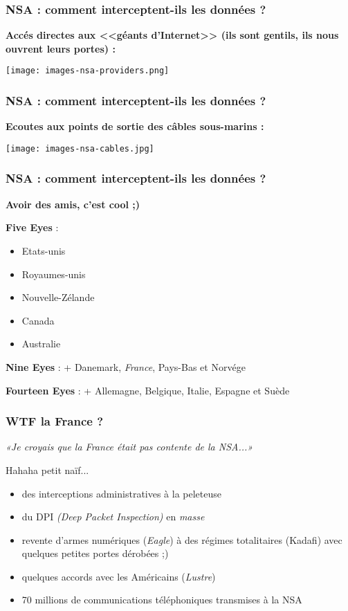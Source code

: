 \begin{frame}\frametitle{NSA : comment interceptent-ils les données ?}
    \textbf{Accés directes aux <<géants d'Internet>> (ils sont gentils, ils
    nous ouvrent leurs portes) :}
    \vspace{1em}
    \begin{center}
        \texttt{[image: images-nsa-providers.png]}
    \end{center}
\end{frame}


\begin{frame}\frametitle{NSA : comment interceptent-ils les données ?}
    \textbf{Ecoutes aux points de sortie des câbles sous-marins :}
    \vspace{1em}
    \begin{center}
        \texttt{[image: images-nsa-cables.jpg]}
    \end{center}
\end{frame}


\begin{frame}\frametitle{NSA : comment interceptent-ils les données ?}
    {\center \huge \bfseries Avoir des amis, c'est cool ;)}

    \vspace{1em}
    \textbf{Five Eyes} :
    \begin{itemize}
        \item Etats-unis
        \item Royaumes-unis
        \item Nouvelle-Zélande
        \item Canada
        \item Australie
    \end{itemize}
    \textbf{Nine Eyes} : + Danemark, \emph{France}, Pays-Bas et Norvége

    \textbf{Fourteen Eyes} : + Allemagne, Belgique, Italie, Espagne et Suède
\end{frame}


\begin{frame}\frametitle{WTF la France ?}
    \emph{«Je croyais que la France était pas contente de la NSA...»}
    
    Hahaha petit naïf...

    \vspace{1em}
    \begin{itemize}
        \item des interceptions administratives à la peleteuse
        \item du DPI \emph{(Deep Packet Inspection)} en \emph{masse}
        \item revente d'armes numériques (\emph{Eagle}) à des régimes totalitaires
            (Kadafi) avec quelques petites portes dérobées ;)
        \item quelques accords avec les Américains (\emph{Lustre})
        \item 70 millions de communications téléphoniques transmises à la NSA
    \end{itemize}
\end{frame}

